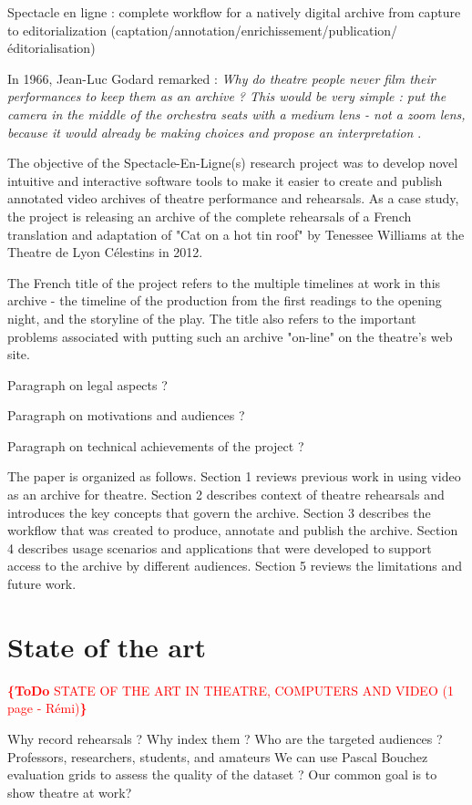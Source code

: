 \documentclass[conference]{IEEEtran}
\newcommand{\todo}[1]{\noindent\textcolor{red}{{\bf \{ToDo} #1{\bf \}}}}
\begin{document}
Spectacle en ligne : complete workflow for a natively digital archive from capture to editorialization
(captation/annotation/enrichissement/publication/éditorialisation)

In 1966, Jean-Luc Godard remarked : {\em Why do theatre people never film their performances to keep  them as an archive ? This would be very simple : put the camera in the middle of the orchestra seats with a medium lens -  not  a zoom lens, because it would already be making choices and propose an interpretation} \cite{Godard66}.

The objective of the Spectacle-En-Ligne(s) research project was to develop novel intuitive and interactive software tools to make it easier to 
create and publish annotated video archives of theatre performance and rehearsals. As a case study, the project is releasing an archive of 
the complete rehearsals of a French translation and adaptation of "Cat on a hot tin roof" by Tenessee Williams at the Theatre de Lyon Célestins
in 2012. 

The French title of the project refers to the multiple timelines at work in this archive   - the timeline of the production from the first readings to the opening night, and the storyline of the play. The title also refers to the important problems associated with putting such an archive "on-line" on the theatre's web site.

Paragraph on legal aspects ? 

Paragraph on motivations and audiences ? 

Paragraph on technical achievements of the project ?

The paper is organized as follows. Section 1 reviews previous work in using video as an archive for theatre. Section 2 describes
context of theatre rehearsals and introduces the key concepts that govern the archive. Section 3 describes the workflow that was
created to produce, annotate and publish the archive. Section 4 describes usage scenarios and applications that were developed
to support access to the archive by different audiences. Section 5 reviews the limitations and future work.



\section{State of the art}
\todo{STATE OF THE ART IN THEATRE, COMPUTERS AND VIDEO (1 page - Rémi)}

Why record rehearsals ?
Why index them ?
Who are the targeted audiences ? Professors, researchers, students, and amateurs
We can use Pascal Bouchez evaluation grids to assess the quality of the dataset ?
Our common goal is to show theatre at work?
\end{document}
